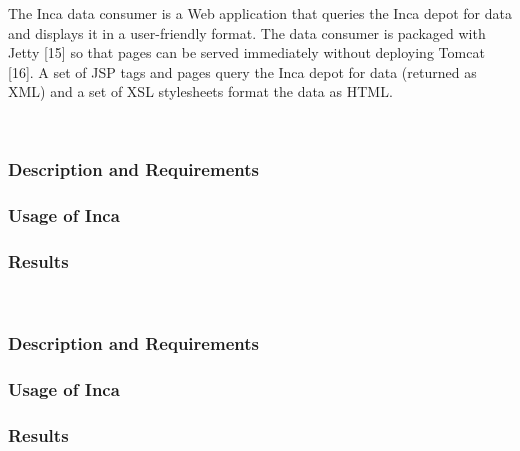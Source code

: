 \documentclass[times, 10pt,twocolumn]{article}
\begin{document}

The Inca data consumer is a Web application that queries the Inca depot for
data and displays it in a user-friendly format.  The data consumer is
packaged with Jetty [15] so that pages can be served immediately without
deploying Tomcat [16].  A set of JSP tags and pages query the Inca depot for
data (returned as XML) and a set of XSL stylesheets format the data as HTML.

~\newpage
~\newpage
~\newpage
~\newpage



\subsubsection{Description and Requirements}


\subsubsection{Usage of Inca}


\subsubsection{Results}


~\newpage


\subsubsection{Description and Requirements}


\subsubsection{Usage of Inca}


\subsubsection{Results}
\end{document}
